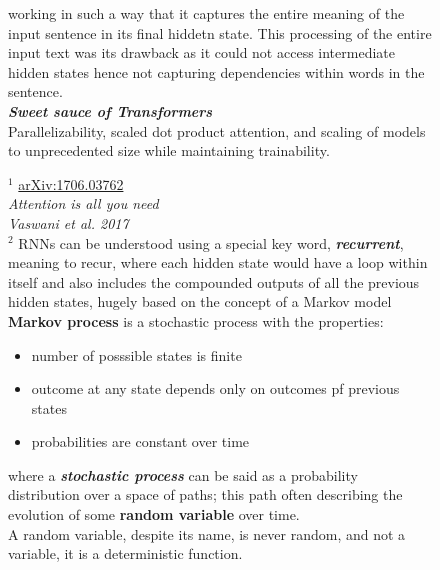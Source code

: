 \documentclass[12pt]{article}
\begin{document}
\begin{figure}[!htb]
\begin{minipage}[t]{0.65\textwidth}
    working in such a way that it captures the entire meaning of the input sentence in its final hiddetn state. This processing of the 
    entire input text was its drawback as it could not access intermediate hidden states hence not capturing dependencies within words
    in the sentence.\\
    \vspace{1em}
    \small \textcolor{xtitle}{\textbf{\textit{Sweet sauce of Transformers}}}\\
    \normalsize
    Parallelizability, scaled dot product attention, and scaling of models to unprecedented size while maintaining trainability.
    
    \end{minipage}
    \hspace{25pt}
    \begin{minipage}[t]{.4\textwidth}
      \raggedright
      \scriptsize 
      $^1$ 	\href{https://arxiv.org/abs/1706.03762}{arXiv:1706.03762}\\
      {\it Attention is all you need}\\
      {\it Vaswani et al. 2017}\\
      \vspace{2em}
      $^2$ RNNs can be understood using a special key word, {\it \bf recurrent}, meaning to recur, where each hidden 
      state would have a loop within itself and also includes the compounded outputs of all the previous hidden states,
      hugely based on the concept of a Markov model\\
      \vspace{2em}
      {\bf Markov process} is a stochastic process with the properties:
      \begin{itemize}[left=0pt,topsep=0pt,itemsep=-1ex,parsep=0ex]
        \item number of posssible states is finite
        \item outcome at any state depends only on outcomes pf previous states
        \item probabilities are constant over time 
      \end{itemize}
      where a \textit{\textbf{stochastic process}} can be said as a probability distribution over a space of paths;
      this path often describing the evolution of some {\bf random variable} over time.\\
      \vspace{1em}
      A random variable, despite its name, is never random, and not a variable, it is a deterministic function.\\

\end{minipage}
\end{figure}
\end{document}
